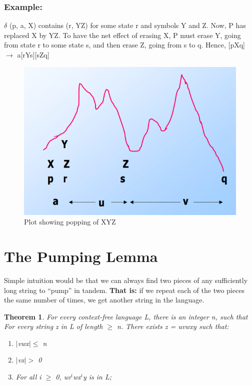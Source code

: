 \documentclass{report}
\newtheorem{theorem}{Theorem}
\begin{document}
\subsubsection{Example:}
$\delta$ (p, a, X) contains (r, YZ) for some state r and symbols Y
and Z. Now, P has replaced X by YZ. To have the net effect of erasing X, P must erase Y, going from state r to some state s, and then erase Z, going from s to q. Hence, [pXq] $\rightarrow$ a[rYs][sZq]
\begin{figure}[h]
    \centering
    \includegraphics[scale=0.5]{popXYZ.png}
    \caption{Plot showing popping of XYZ}
    \label{fig:my_label}
\end{figure}
\section{The Pumping Lemma}
Simple intuition would be that we can always find two pieces of any sufficiently long string to “pump” in tandem. \textbf{That is:} if we repeat each of the two pieces the same number of times, we get another string in the language.
\begin{theorem}
For every context-free language L, there is an integer n, such that For every string z in L of length $\geqslant$ n. There exists z = uvwxy such that:
\begin{enumerate}
    \item $|$vwx$| \leqslant$ n
    \item $|$vx$| >$ 0
    \item For all i $\geqslant$ 0, uv$^i$wx$^i$y is in L;
\end{enumerate}
\end{theorem}
\end{document}

